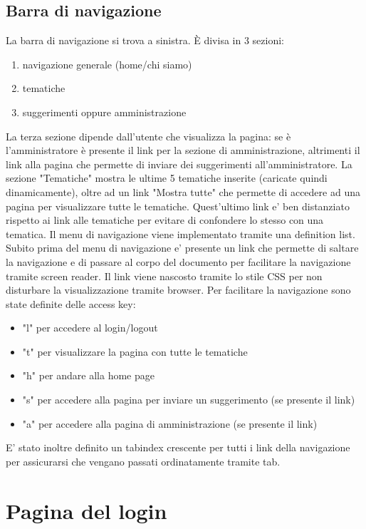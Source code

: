 \documentclass[a4paper,10pt]{article}
\begin{document}
\subsection{Barra di navigazione}
La barra di navigazione si trova a sinistra. \`E divisa in 3 sezioni:
\begin{enumerate}
 \item navigazione generale (home/chi siamo)
 \item tematiche
 \item suggerimenti oppure amministrazione
\end{enumerate}
La terza sezione dipende dall'utente che visualizza la pagina: se \`e l'amministratore \`e presente il link per la sezione di amministrazione, altrimenti il link alla pagina che permette di inviare dei suggerimenti all'amministratore.
La sezione "Tematiche" mostra le ultime 5 tematiche inserite (caricate quindi dinamicamente), oltre ad un link "Mostra tutte" che permette di accedere ad una pagina per visualizzare tutte le tematiche. Quest'ultimo link e' ben distanziato rispetto ai link alle tematiche per evitare di confondere lo stesso con una tematica.
Il menu di navigazione viene implementato tramite una definition list.
Subito prima del menu di navigazione e' presente un link che permette di saltare la navigazione e di passare al corpo del documento per facilitare la navigazione tramite screen reader. Il link viene nascosto tramite lo stile CSS per non disturbare la visualizzazione tramite browser.
Per facilitare la navigazione sono state definite delle access key:
\begin{itemize}
 \item "l" per accedere al login/logout
 \item "t" per visualizzare la pagina con tutte le tematiche
 \item "h" per andare alla home page
 \item "s" per accedere alla pagina per inviare un suggerimento (se presente il link)
 \item "a" per accedere alla pagina di amministrazione (se presente il link)
\end{itemize}
E' stato inoltre definito un tabindex crescente per tutti i link della navigazione per assicurarsi che vengano passati ordinatamente tramite tab.

\section{Pagina del login}
\end{document}
